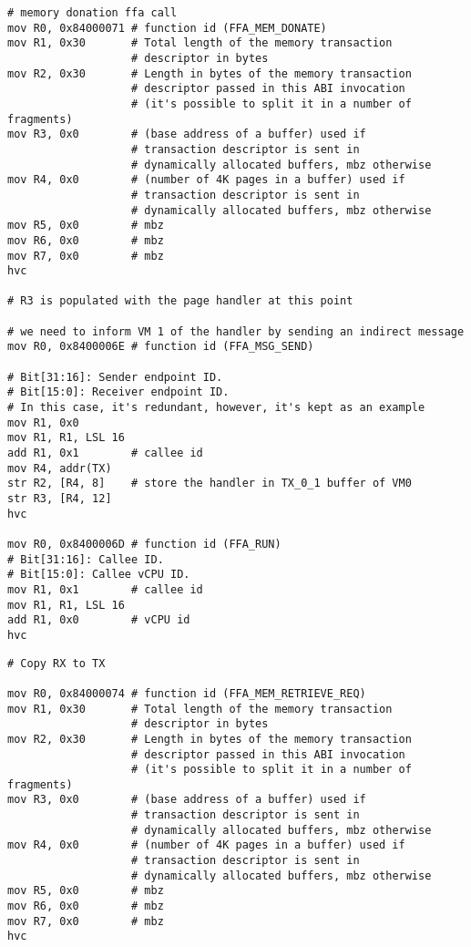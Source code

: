 \documentclass{article}
\begin{document}
\begin{lstlisting}[caption={VM 0}]
# memory donation ffa call
mov R0, 0x84000071 # function id (FFA_MEM_DONATE)
mov R1, 0x30       # Total length of the memory transaction 
                   # descriptor in bytes
mov R2, 0x30       # Length in bytes of the memory transaction 
                   # descriptor passed in this ABI invocation
                   # (it's possible to split it in a number of fragments)
mov R3, 0x0        # (base address of a buffer) used if 
                   # transaction descriptor is sent in 
                   # dynamically allocated buffers, mbz otherwise
mov R4, 0x0        # (number of 4K pages in a buffer) used if 
                   # transaction descriptor is sent in 
                   # dynamically allocated buffers, mbz otherwise
mov R5, 0x0        # mbz
mov R6, 0x0        # mbz
mov R7, 0x0        # mbz
hvc

# R3 is populated with the page handler at this point

# we need to inform VM 1 of the handler by sending an indirect message
mov R0, 0x8400006E # function id (FFA_MSG_SEND)

# Bit[31:16]: Sender endpoint ID.
# Bit[15:0]: Receiver endpoint ID.
# In this case, it's redundant, however, it's kept as an example
mov R1, 0x0
mov R1, R1, LSL 16
add R1, 0x1        # callee id
mov R4, addr(TX)
str R2, [R4, 8]    # store the handler in TX_0_1 buffer of VM0
str R3, [R4, 12]
hvc

mov R0, 0x8400006D # function id (FFA_RUN)
# Bit[31:16]: Callee ID.
# Bit[15:0]: Callee vCPU ID.
mov R1, 0x1        # callee id
mov R1, R1, LSL 16
add R1, 0x0        # vCPU id
hvc
\end{lstlisting}

\begin{lstlisting}[caption={VM 1}]
# Copy RX to TX

mov R0, 0x84000074 # function id (FFA_MEM_RETRIEVE_REQ)
mov R1, 0x30       # Total length of the memory transaction 
                   # descriptor in bytes
mov R2, 0x30       # Length in bytes of the memory transaction 
                   # descriptor passed in this ABI invocation
                   # (it's possible to split it in a number of fragments)
mov R3, 0x0        # (base address of a buffer) used if 
                   # transaction descriptor is sent in 
                   # dynamically allocated buffers, mbz otherwise
mov R4, 0x0        # (number of 4K pages in a buffer) used if 
                   # transaction descriptor is sent in 
                   # dynamically allocated buffers, mbz otherwise
mov R5, 0x0        # mbz
mov R6, 0x0        # mbz
mov R7, 0x0        # mbz
hvc
\end{lstlisting}
\end{document}
